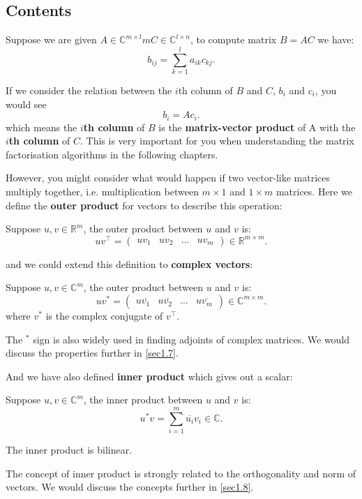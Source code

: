 \subsection*{Contents}
\begin{definition}
  Suppose we are given $A \in \mathbb{C}^{m \times l}m C \in \mathbb{C}^{l \times n}$, to compute matrix $B = AC$ we have:
  \[
    b_{ij} = \sum_{k = 1}^{l} a_{ik}c_{kj} 
  .\]  
\end{definition}
\begin{note}
  If we consider the relation between the \(i\)th column of \(B\) and \(C\), \(b_i\)  and \(c_i\), you would see
  \[
    b_i = Ac_i
  .\]
  which means the \textbf{\(i\)th column} of \(B\) is the \textbf{matrix-vector product} of A with the \textbf{\(i\)th column} of \(C\). This is very important for you when understanding the matrix factorisation algorithms in the following chapters. \checked
\end{note}
However, you might consider what would happen if two vector-like matrices multiply together, i.e. multiplication between \(m \times 1\) and \(1 \times  m\) matrices. Here we define the \textbf{outer product} for vectors to describe this operation:
\begin{definition}
  Suppose \(u, v \in \mathbb{R}^{m}\), the outer product between \(u\) and \(v\) is:
  \[
    uv^{\top} = \begin{pmatrix} 
      uv_1 & uv_2 & \dots & uv_m 
    \end{pmatrix} \in \mathbb{R}^{m\times m}
  .\]
\end{definition}
and we could extend this definition to \textbf{complex vectors}:
\begin{definition}
  Suppose \(u, v \in \mathbb{C}^{m}\), the outer product between \(u\)  and \(v\)  is:
  \[
    uv^{*} = \begin{pmatrix} 
      u\overline{v_1} & u\overline{v_2} & \dots & u\overline{v_m}
    \end{pmatrix} \in \mathbb{C}^{m \times  m} 
  .\]
  where \(v^{*}\) is the complex conjugate of \(v^{\top}\).
\end{definition}     
The \(^{*}\) sign is also widely used in finding adjoints of complex matrices. We would discuss the properties further in \autoref{sec1.7}. \smallskip

\noindent And we have also defined \textbf{inner product} which gives out a scalar:
\begin{definition}
  Suppose \(u, v \in \mathbb{C}^{m}\), the inner product between \(u\)  and \(v\)  is:
  \[
    u^{*}v = \sum_{i=1}^{m} \overline{u_i}v_i \in \mathbb{C}
  .\] 
\end{definition}   
\begin{property}
  The inner product is bilinear.
\end{property}
The concept of inner product is strongly related to the orthogonality and norm of vectors. We would discuss the concepts further in \autoref{sec1.8}. \checked
